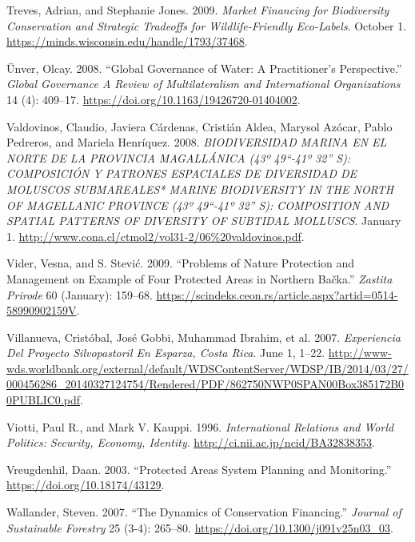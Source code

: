 \begin{CSLReferences}{1}{1}
Treves, Adrian, and Stephanie Jones. 2009. \emph{Market Financing for
Biodiversity Conservation and Strategic Tradeoffs for Wildlife-Friendly
Eco-Labels}. October 1.
\url{https://minds.wisconsin.edu/handle/1793/37468}.

Ünver, Olcay. 2008. {``Global Governance of Water: A Practitioner's
Perspective.''} \emph{Global Governance A Review of Multilateralism and
International Organizations} 14 (4): 409--17.
\url{https://doi.org/10.1163/19426720-01404002}.

Valdovinos, Claudio, Javiera Cárdenas, Cristián Aldea, Marysol Azócar,
Pablo Pedreros, and Mariela Henríquez. 2008. \emph{BIODIVERSIDAD MARINA
EN EL NORTE DE LA PROVINCIA MAGALLÁNICA (43º 49{``-41º 32''} S):
COMPOSICIÓN Y PATRONES ESPACIALES DE DIVERSIDAD DE MOLUSCOS SUBMAREALES*
MARINE BIODIVERSITY IN THE NORTH OF MAGELLANIC PROVINCE (43º 49{``-41º
32''} S): COMPOSITION AND SPATIAL PATTERNS OF DIVERSITY OF SUBTIDAL
MOLLUSCS}. January 1.
\url{http://www.cona.cl/ctmol2/vol31-2/06\%20valdovinos.pdf}.

Vider, Vesna, and S. Stević. 2009. {``Problems of Nature Protection and
Management on Example of Four Protected Areas in Northern Bačka.''}
\emph{Zastita Prirode} 60 (January): 159--68.
\url{https://scindeks.ceon.rs/article.aspx?artid=0514-58990902159V}.

Villanueva, Cristóbal, José Gobbi, Muhammad Ibrahim, et al. 2007.
\emph{Experiencia Del Proyecto Silvopastoril En Esparza, Costa Rica}.
June 1, 1--22.
\url{http://www-wds.worldbank.org/external/default/WDSContentServer/WDSP/IB/2014/03/27/000456286_20140327124754/Rendered/PDF/862750NWP0SPAN00Box385172B00PUBLIC0.pdf}.

Viotti, Paul R., and Mark V. Kauppi. 1996. \emph{International Relations
and World Politics: Security, Economy, Identity}.
\url{http://ci.nii.ac.jp/ncid/BA32838353}.

Vreugdenhil, Daan. 2003. {``Protected Areas System Planning and
Monitoring.''} \url{https://doi.org/10.18174/43129}.

Wallander, Steven. 2007. {``The Dynamics of Conservation Financing.''}
\emph{Journal of Sustainable Forestry} 25 (3-4): 265--80.
\url{https://doi.org/10.1300/j091v25n03_03}.


\end{CSLReferences}

